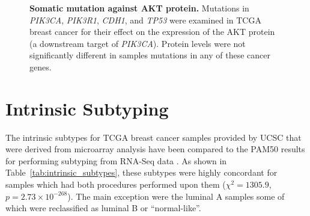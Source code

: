 \begin{figure}[!ht]
\begin{center}
    \end{center}
    \caption[Somatic mutation against AKT protein]{\small \textbf{Somatic mutation against AKT protein.} Mutations in \textit{PIK3CA}, \textit{PIK3R1}, \textit{CDH1}, and \textit{TP53} were examined in \gls{TCGA} breast cancer for their effect on the expression of the AKT protein (a downstream target of \textit{PIK3CA}). Protein levels were not significantly different in samples mutations in any of these cancer genes.
}
\label{fig:mutation_expr_prot2}
\end{figure}
\fi


\clearpage
\chapter{Intrinsic Subtyping} \label{appendix:intrinsic_subtypes}
The intrinsic subtypes for \gls{TCGA} breast cancer samples provided by \gls{UCSC} \citep{TCGA2012, UCSC2012} that were derived from microarray analysis have been compared to the \gls{PAM50} results for performing subtyping from \gls{RNA-Seq} data \citep{Parker2009}. As shown in Table~\ref{tab:intrinsic_subtypes}, these subtypes were highly concordant for samples which had both procedures performed upon them ($\chi^2 = 1305.9$, $p = 2.73 \times 10^{-268}$). The main exception were the luminal A samples some of which were reclassified as luminal B or ``normal-like''.

